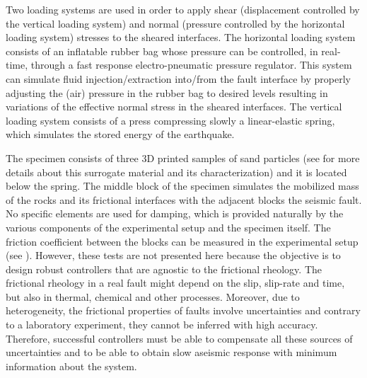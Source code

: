 \documentclass[journal,twoside,web]{ieeecolor}
\begin{document}
Two loading systems are used in order to apply shear (displacement controlled by the vertical loading system) and normal (pressure controlled by the horizontal loading system) stresses to the sheared interfaces. The horizontal loading system consists of an inflatable rubber bag whose pressure can be controlled, in real-time, through a fast response electro-pneumatic pressure regulator. This system can simulate fluid injection/extraction into/from the fault interface by properly adjusting the (air) pressure in the rubber bag to desired levels resulting in variations of the effective normal stress in the sheared interfaces. The vertical loading system consists of a press compressing slowly a linear-elastic spring, which simulates the stored energy of the earthquake. 

The specimen consists of three 3D printed samples of sand particles (see \cite{b:Braun-Tzortzopoulos-Stefanou-2021} for more details about this surrogate material and its characterization) and it is located below the spring. The middle block of the specimen simulates the mobilized mass of the rocks and its frictional interfaces with the adjacent blocks the seismic fault. No specific elements are used for damping, which is provided naturally by the various components of the experimental setup and the specimen itself. The friction coefficient between the blocks can be measured in the experimental setup (see \cite{b:Tzortzopoulos-2021,b:Braun-Tzortzopoulos-Stefanou-2021}). However, these tests are not presented here because the objective is to design robust controllers that are agnostic to the frictional rheology. The frictional rheology in a real fault might depend on the slip, slip-rate and time, but also in thermal, chemical and other processes. Moreover, due to heterogeneity, the frictional properties of faults involve uncertainties and contrary to a laboratory experiment, they cannot be inferred with high accuracy. Therefore, successful controllers must be able to compensate all these sources of uncertainties and to be able to obtain slow aseismic response with minimum information about the system.
\end{document}
